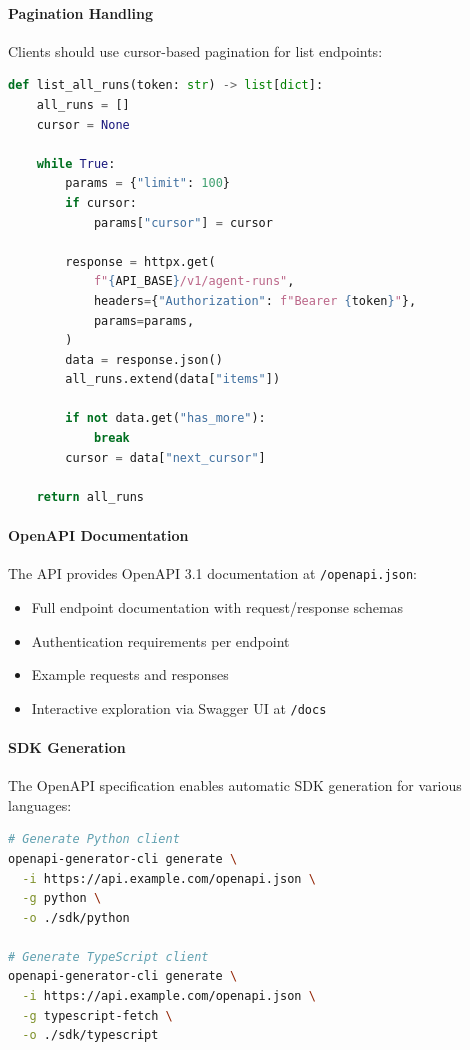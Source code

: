 \paragraph{Pagination Handling}
Clients should use cursor-based pagination for list endpoints:

\begin{lstlisting}[language=Python, caption={Cursor-based pagination example.}]
def list_all_runs(token: str) -> list[dict]:
    all_runs = []
    cursor = None
    
    while True:
        params = {"limit": 100}
        if cursor:
            params["cursor"] = cursor
        
        response = httpx.get(
            f"{API_BASE}/v1/agent-runs",
            headers={"Authorization": f"Bearer {token}"},
            params=params,
        )
        data = response.json()
        all_runs.extend(data["items"])
        
        if not data.get("has_more"):
            break
        cursor = data["next_cursor"]
    
    return all_runs
\end{lstlisting}

\paragraph{OpenAPI Documentation}
The API provides OpenAPI 3.1 documentation at \texttt{/openapi.json}:
\begin{itemize}
    \item Full endpoint documentation with request/response schemas
    \item Authentication requirements per endpoint
    \item Example requests and responses
    \item Interactive exploration via Swagger UI at \texttt{/docs}
\end{itemize}

\paragraph{SDK Generation}
The OpenAPI specification enables automatic SDK generation for various languages:

\begin{lstlisting}[language=bash, caption={SDK generation example.}]
# Generate Python client
openapi-generator-cli generate \
  -i https://api.example.com/openapi.json \
  -g python \
  -o ./sdk/python

# Generate TypeScript client
openapi-generator-cli generate \
  -i https://api.example.com/openapi.json \
  -g typescript-fetch \
  -o ./sdk/typescript
\end{lstlisting}
